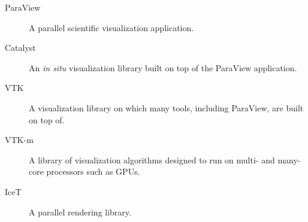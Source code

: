 \documentclass{article}
\begin{document}
\begin{description}
\item[ParaView] A parallel scientific visualization application.
\item[Catalyst] An \emph{in situ} visualization library built on top of the ParaView application.
\item[VTK] A visualization library on which many tools, including ParaView, are built on top of.
\item[VTK-m] A library of visualization algorithms designed to run on multi- and many-core processors such as GPUs.
\item[IceT] A parallel rendering library.
\end{description}
\end{document}
